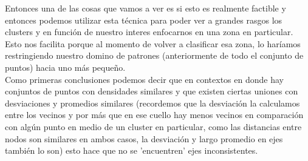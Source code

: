 \documentclass[11pt,a4paper]{article}
\begin{document}
Entonces una de las cosas que vamos a ver es si esto es realmente factible y entonces podemos utilizar esta técnica para poder ver a grandes rasgos los clusters y en función de nuestro interes enfocarnos en una zona en particular. Esto nos facilita porque al momento de volver a clasificar esa zona, lo haríamos restringiendo nuestro domino de patrones (anteriormente de todo el conjunto de puntos) hacia uno más pequeño.\\ 
Como primeras conclusiones podemos decir que en contextos en donde hay conjuntos de puntos con densidades similares y que existen ciertas uniones con desviaciones y promedios similares (recordemos que la desviación la calculamos entre los vecinos y por más que en ese cuello hay menos vecinos en comparación con algún punto en medio de un cluster en particular, como las distancias entre nodos son similares en ambos casos, la desviación y largo promedio en ejes también lo son)  esto hace que no se 'encuentren' ejes inconsistentes. 
\\
\end{document}
